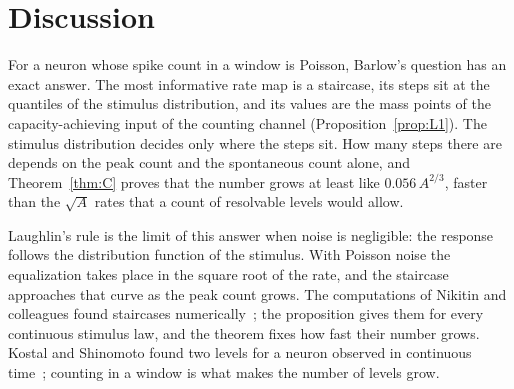 
\section{Discussion}\label{sec:discussion}

For a neuron whose spike count in a window is Poisson, Barlow's question has an exact answer. The most informative rate map is a
staircase, its steps sit at the quantiles of the stimulus distribution, and its values are the mass points of the capacity-achieving
input of the counting channel (Proposition~\ref{prop:L1}). The stimulus distribution decides only where the steps sit. How many steps
there are depends on the peak count and the spontaneous count alone, and Theorem~\ref{thm:C} proves that the number grows at least like
$0.056\,A^{2/3}$, faster than the $\sqrt A$ rates that a count of resolvable levels would allow.

Laughlin's rule is the limit of this answer when noise is negligible: the response follows the distribution function of the stimulus.
With Poisson noise the equalization takes place in the square root of the rate, and the staircase approaches that curve as the peak
count grows. The computations of Nikitin and colleagues found staircases numerically~\cite{Nikitin2009}; the proposition gives them
for every continuous stimulus law, and the theorem fixes how fast their number grows. Kostal and Shinomoto found two levels for a
neuron observed in continuous time~\cite{KostalShinomoto2016}; counting in a window is what makes the number of levels grow.

